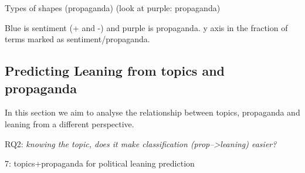 Types of shapes (propaganda)
(look at purple: propaganda)

Blue is sentiment (+ and -) and purple is propaganda. 
y axis in the fraction of terms marked as sentiment/propaganda.

\subsection{Predicting Leaning from topics and propaganda}

In this section we aim to analyse the relationship between topics, propaganda and leaning from a different perspective.

RQ2: \emph{knowing the topic, does it make classification (prop-->leaning) easier?}

7: topics+propaganda for political leaning prediction